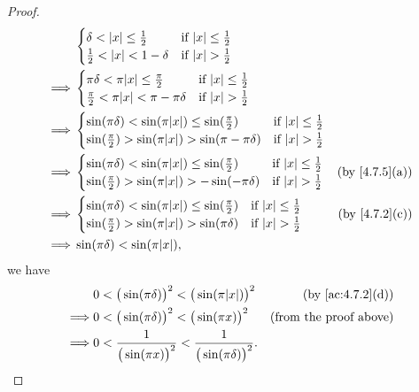 \begin{proof}
\begin{align*}
             & \begin{cases}
                 \delta < \abs{x} \leq \frac{1}{2}  & \text{if } \abs{x} \leq \frac{1}{2} \\
                 \frac{1}{2} < \abs{x} < 1 - \delta & \text{if } \abs{x} > \frac{1}{2}    \\
               \end{cases}                               \\
    \implies & \begin{cases}
                 \pi \delta < \pi \abs{x} \leq \frac{\pi}{2}    & \text{if } \abs{x} \leq \frac{1}{2} \\
                 \frac{\pi}{2} < \pi \abs{x} < \pi - \pi \delta & \text{if } \abs{x} > \frac{1}{2}    \\
               \end{cases}                   \\
    \implies & \begin{cases}
                 \sin(\pi \delta) < \sin(\pi \abs{x}) \leq \sin(\frac{\pi}{2})    & \text{if } \abs{x} \leq \frac{1}{2} \\
                 \sin(\frac{\pi}{2}) > \sin(\pi \abs{x}) > \sin(\pi - \pi \delta) & \text{if } \abs{x} > \frac{1}{2}    \\
               \end{cases} \\
    \implies & \begin{cases}
                 \sin(\pi \delta) < \sin(\pi \abs{x}) \leq \sin(\frac{\pi}{2}) & \text{if } \abs{x} \leq \frac{1}{2} \\
                 \sin(\frac{\pi}{2}) > \sin(\pi \abs{x}) > -\sin(-\pi \delta)  & \text{if } \abs{x} > \frac{1}{2}    \\
               \end{cases}    & \text{(by \cref{4.7.5}(a))}    \\
    \implies & \begin{cases}
                 \sin(\pi \delta) < \sin(\pi \abs{x}) \leq \sin(\frac{\pi}{2}) & \text{if } \abs{x} \leq \frac{1}{2} \\
                 \sin(\frac{\pi}{2}) > \sin(\pi \abs{x}) > \sin(\pi \delta)    & \text{if } \abs{x} > \frac{1}{2}    \\
               \end{cases}    & \text{(by \cref{4.7.2}(c))}    \\
    \implies & \sin(\pi \delta) < \sin(\pi \abs{x}),
  \end{align*}
  we have
  \begin{align*}
             & 0 < \big(\sin(\pi \delta)\big)^2 < \big(\sin(\pi \abs{x})\big)^2                & \text{(by \cref{ac:4.7.2}(d))} \\
    \implies & 0 < \big(\sin(\pi \delta)\big)^2 < \big(\sin(\pi x)\big)^2                      & \text{(from the proof above)}  \\
    \implies & 0 < \frac{1}{\big(\sin(\pi x)\big)^2} < \frac{1}{\big(\sin(\pi \delta)\big)^2}.
  \end{align*}
\end{proof}

